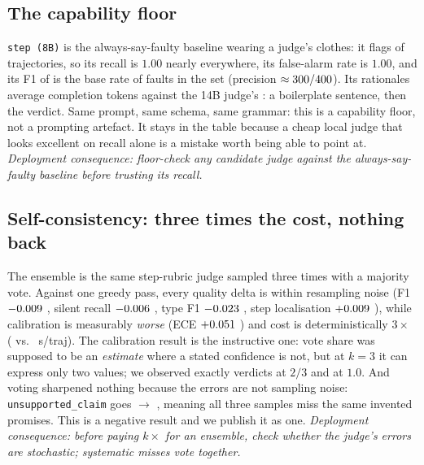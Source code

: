 \documentclass{article}
\newcommand{\ci}[1]{{\scriptsize\textcolor{cigray}{#1}}}
\newcommand{\ftype}[1]{\texttt{#1}}
\newcommand{\judge}[1]{\texttt{#1}}
\begin{document}
\subsection{The capability floor}
\label{sec:capability-floor}

\judge{step (8B)} is the always-say-faulty baseline wearing a judge's clothes: it flags
\tjStepLFlags{} of \tjNTraj{} trajectories, so its recall is $1.00$ nearly everywhere, its
false-alarm rate is $1.00$, and its F1 of \tjStepLFone{} is the base rate of faults in the
set (precision \tjStepLPrecision{} $\approx 300/400$). Its rationales average
\tjStepLMeanTokens{} completion tokens against the 14B judge's \tjStepQMeanTokens{}: a
boilerplate sentence, then the verdict. Same prompt, same schema, same grammar: this is a
capability floor, not a prompting artefact. It stays in the table because a cheap local judge
that looks excellent on recall alone is a mistake worth being able to point at.
\emph{Deployment consequence: floor-check any candidate judge against the always-say-faulty
baseline before trusting its recall.}

\subsection{Self-consistency: three times the cost, nothing back}
\label{sec:selfcons}

The ensemble is the same step-rubric judge sampled three times with a majority vote. Against
one greedy pass, every quality delta is within resampling noise (F1
$-0.009$ \ci{\tjDeltaSelfconsFoneCI}, silent recall $-0.006$
\ci{\tjDeltaSelfconsSilentCI}, type F1 $-0.023$ \ci{\tjDeltaSelfconsTypeFCI},
step localisation $+0.009$ \ci{\tjDeltaSelfconsStepExactCI}), while
calibration is measurably \emph{worse} (ECE $+0.051$
\ci{\tjDeltaSelfconsECECI}) and cost is deterministically $3\times$ (\tjSelfconsCost{} vs.\
\tjStepQCost{} s/traj). The calibration result is the instructive one: vote share was
supposed to be an \emph{estimate} where a stated confidence is not, but at $k{=}3$ it can
express only two values; we observed exactly \tjSelfconsTwoThirds{} verdicts at $2/3$ and
\tjSelfconsUnanimous{} at $1.0$. And voting sharpened nothing because the errors are not
sampling noise: \ftype{unsupported\_claim} goes \tjStepQUnsupClaim{} $\to$
\tjSelfconsUnsupClaim{}, meaning all three samples miss the same invented promises. This is a
negative result and we publish it as one. \emph{Deployment consequence: before paying
$k\times$ for an ensemble, check whether the judge's errors are stochastic; systematic misses
vote together.}
\end{document}
